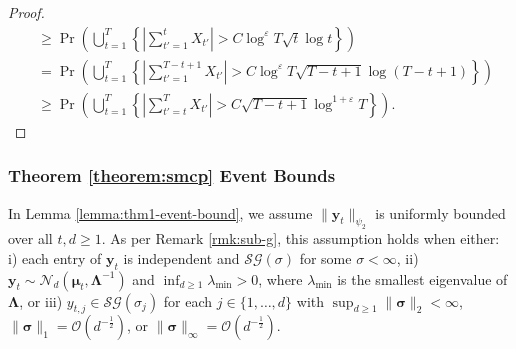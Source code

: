 \begin{proof}
\begin{align*}
     &\geq \Pr \left(\bigcup_{t=1}^{T}\left\{\left|\sum_{t'=1}^{t} X_{t'}\right| > C\log^{\varepsilon}T\sqrt{t}\log t\right\}\right) \\
    &= \Pr \left(\bigcup_{t=1}^{T}\left\{\left|\sum_{t'=1}^{T - t + 1} X_{t'}\right| > C\log^{\varepsilon}T\sqrt{T - t + 1}\log (T - t+1)\right\}\right)  \\
    &\geq \Pr \left(\bigcup_{t=1}^{T}\left\{\left|\sum_{t'=t}^{T} X_{t'}\right| > C\sqrt{T-t+1}\log^{1 + \varepsilon}T\right\}\right). \tag{$T > T-t+1$}
\end{align*}
\end{proof}


\subsubsection{Theorem \ref{theorem:smcp} Event Bounds}
\label{app:thm1-events}

In Lemma \ref{lemma:thm1-event-bound}, we assume $\lVert \mathbf{y}_t\rVert_{\psi_2}$ is uniformly bounded over all $t, d \geq 1$. As per Remark \ref{rmk:sub-g}, this assumption holds when either: i) each entry of $\mathbf{y}_t$ is independent and $\mathcal{SG}(\sigma)$ for some $\sigma < \infty$, ii) $\mathbf{y}_t \sim \mathcal{N}_d(\boldsymbol{\mu}_t, \boldsymbol{\Lambda}^{-1})$ and $\inf_{d\geq 1}  \lambda_{\min} > 0$, where $\lambda_{\min}$ is the smallest eigenvalue of $\boldsymbol{\Lambda}$, or iii) $y_{t,j} \in \mathcal{SG}(\sigma_j)$ for each $j \in \{1,\ldots, d\}$ with $\sup_{d \geq 1} \lVert\boldsymbol{\sigma}\rVert_2 < \infty$, $\lVert\boldsymbol{\sigma}\rVert_1 = \mathcal{O}(d^{-\frac{1}{2}})$, or $\lVert\boldsymbol{\sigma}\rVert_\infty = \mathcal{O}(d^{-\frac{1}{2}})$. 

